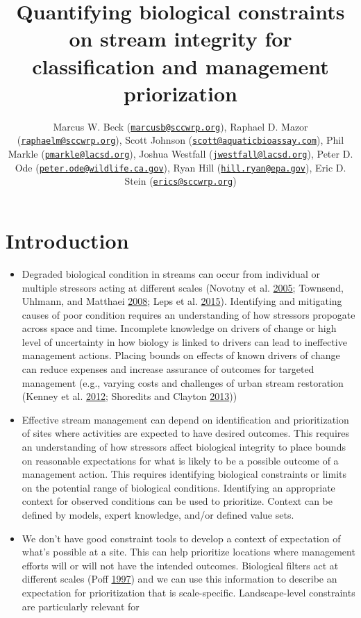 \documentclass[]{article}
\title{Quantifying biological constraints on stream integrity for
classification and management priorization}
\author{Marcus W. Beck
(\href{mailto:marcusb@sccwrp.org}{\nolinkurl{marcusb@sccwrp.org}}),
Raphael D. Mazor
(\href{mailto:raphaelm@sccwrp.org}{\nolinkurl{raphaelm@sccwrp.org}}),
Scott Johnson
(\href{mailto:scott@aquaticbioassay.com}{\nolinkurl{scott@aquaticbioassay.com}}),
Phil Markle
(\href{mailto:pmarkle@lacsd.org}{\nolinkurl{pmarkle@lacsd.org}}), Joshua
Westfall
(\href{mailto:jwestfall@lacsd.org}{\nolinkurl{jwestfall@lacsd.org}}),
Peter D. Ode
(\href{mailto:peter.ode@wildlife.ca.gov}{\nolinkurl{peter.ode@wildlife.ca.gov}}),
Ryan Hill
(\href{mailto:hill.ryan@epa.gov}{\nolinkurl{hill.ryan@epa.gov}}), Eric
D. Stein (\href{mailto:erics@sccwrp.org}{\nolinkurl{erics@sccwrp.org}})}
\date{}
\begin{document}
\maketitle

\section{Introduction}\label{introduction}

\begin{itemize}
\item
  Degraded biological condition in streams can occur from individual or
  multiple stressors acting at different scales (Novotny et al.
  \protect\hyperlink{ref-Novotny05}{2005}; Townsend, Uhlmann, and
  Matthaei \protect\hyperlink{ref-Townsend08}{2008}; Leps et al.
  \protect\hyperlink{ref-Leps15}{2015}). Identifying and mitigating
  causes of poor condition requires an understanding of how stressors
  propogate across space and time. Incomplete knowledge on drivers of
  change or high level of uncertainty in how biology is linked to
  drivers can lead to ineffective management actions. Placing bounds on
  effects of known drivers of change can reduce expenses and increase
  assurance of outcomes for targeted management (e.g., varying costs and
  challenges of urban stream restoration (Kenney et al.
  \protect\hyperlink{ref-Kenney12}{2012}; Shoredits and Clayton
  \protect\hyperlink{ref-Shoredits13}{2013}))
\item
  Effective stream management can depend on identification and
  prioritization of sites where activities are expected to have desired
  outcomes. This requires an understanding of how stressors affect
  biological integrity to place bounds on reasonable expectations for
  what is likely to be a possible outcome of a management action. This
  requires identifying biological constraints or limits on the potential
  range of biological conditions. Identifying an appropriate context for
  observed conditions can be used to prioritize. Context can be defined
  by models, expert knowledge, and/or defined value sets.
\item
  We don't have good constraint tools to develop a context of
  expectation of what's possible at a site. This can help prioritize
  locations where management efforts will or will not have the intended
  outcomes. Biological filters act at different scales (Poff
  \protect\hyperlink{ref-Poff97}{1997}) and we can use this information
  to describe an expectation for prioritization that is scale-specific.
  Landscape-level constraints are particularly relevant for

\end{itemize}
\end{document}
